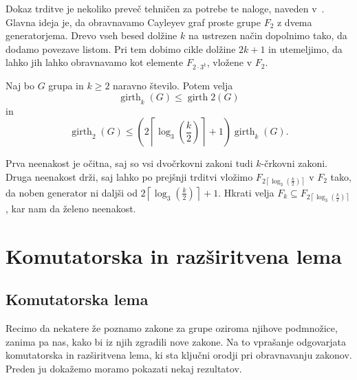 \documentclass[mat1, tisk]{fmfdelo}
\numberwithin{equation}{section}  %
\begin{document}
\begin{dokaz}
    Dokaz trditve je nekoliko preveč tehničen za potrebe te naloge, naveden v~\cite{Schneider_2016}. Glavna ideja je, da obravnavamo Cayleyev graf proste grupe $F_2$ z dvema generatorjema.
Drevo vseh besed dolžine $k$ na ustrezen način dopolnimo tako, da dodamo povezave listom. Pri tem dobimo cikle dolžine $2k + 1$ in utemeljimo, da lahko jih lahko obravnavamo kot elemente $F_{2 \cdot 3^{k}}$, vložene v $F_2$. 
\end{dokaz}


\begin{posledica}\label{psl_veccrkovni_zakoni_meje}
Naj bo $G$ grupa in $k \ge 2$ naravno število. Potem velja \begin{equation*}
     \operatorname{girth}_{k}(G) \le  \operatorname{girth}{2}(G) 
\end{equation*}  
in \begin{equation*}
\operatorname{girth}_{2}(G) \le \left( {2 \left\lceil \log_3(\frac{k}{2}) \right\rceil + 1  } \right) \operatorname{girth}_{k}(G).
\end{equation*}  
\end{posledica}
\begin{dokaz}
    Prva neenakost je očitna, saj so vsi dvočrkovni zakoni tudi $k$-črkovni zakoni. Druga neenakost drži, saj lahko po prejšnji trditvi vložimo $F_{{2 \left\lceil \log_3(\frac{k}{2}) \right\rceil}}$ v $F_2$
    tako, da noben generator ni daljši od ${2 \left\lceil \log_3(\frac{k}{2}) \right\rceil + 1  }$. Hkrati velja $F_k \subseteq F_{{2 \left\lceil \log_3(\frac{k}{2}) \right\rceil}}$, kar nam da želeno neenakost.
\end{dokaz}


\section{Komutatorska in razširitvena lema}


\subsection{Komutatorska lema}

Recimo da nekatere že poznamo zakone za grupe oziroma njihove podmnožice, zanima pa nas, kako bi iz njih zgradili nove zakone. Na to vprašanje odgovarjata komutatorska in razširitvena lema,
ki sta ključni orodji pri obravnavanju zakonov. Preden ju dokažemo moramo pokazati nekaj rezultatov.
\end{document}
